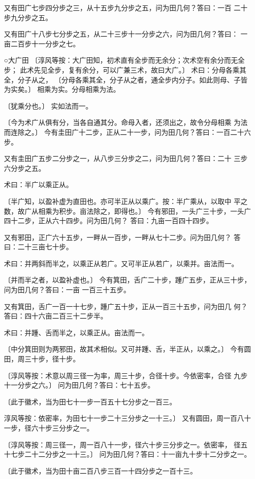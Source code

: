 \documentclass[a4paper,12pt,UTF8,twoside]{ctexbook}
\begin{document}
又有田广七步四分步之三，从十五步九分步之五，问为田几何？答曰：一百 二十步九分步之五。

又有田广十八步七分步之五，从二十三步十一分步之六，问为田几何？答曰： 一亩二百步十一分步之七。

○大广田 〔淳风等按：大广田知，初术直有全步而无余分；次术空有余分而无全步； 此术先见全步，复有余分，可以广兼三术，故曰大广。〕 术曰：分母各乘其全，分子从之， 〔分母各乘其全，分子从之者，通全步内分子。如此则母、子皆为实矣。〕 相乘为实。分母相乘为法。

〔犹乘分也。〕 实如法而一。

〔今为术广从俱有分，当各自通其分。命母入者，还须出之，故令分母相乘 为法而连除之。〕 今有圭田广十二步，正从二十一步，问为田几何？答曰：一百二十六步。

又有圭田广五步二分步之一，从八步三分步之二，问为田几何？答曰：二十 三步六分步之五。

术曰：半广以乘正从。

〔半广知，以盈补虚为直田也。亦可半正从以乘广。按：半广乘从，以取中 平之数，故广从相乘为积步。亩法除之，即得也。〕 今有邪田，一头广三十步，一头广四十二步，正从六十四步。问为田几何？ 答曰：九亩一百四十四步。

又有邪田，正广六十五步，一畔从一百步，一畔从七十二步。问为田几何？ 答曰：二十三亩七十步。

术曰：并两斜而半之，以乘正从若广。又可半正从若广，以乘并。亩法而一。

〔并而半之者，以盈补虚也。〕 今有箕田，舌广二十步，踵广五步，正从三十步，问为田几何？答曰：一亩 一百三十五步。

又有箕田，舌广一百一十七步，踵广五十步，正从一百三十五步，问为田几 何？答曰：四十六亩二百三十二步半。

术曰：并踵、舌而半之，以乘正从。亩法而一。

〔中分箕田则为两邪田，故其术相似。又可并踵、舌，半正从，以乘之。〕 今有圆田，周三十步，径十步。

〔淳风等按：术意以周三径一为率，周三十步，合径十步。今依密率，合径 九步十一分步之六。〕 问为田几何？答曰：七十五步。

〔此于徽术，当为田七十一步一百五十七分步之一百三。

淳风等按：依密率，为田七十一步二十三分步之一十三。〕 又有圆田，周一百八十一步，径六十步三分步之一。

〔淳风等按：周三径一，周一百八十一步，径六十步三分步之一。依密率， 径五十七步二十二分步之一十三。〕 问为田几何？答曰：十一亩九十步十二分步之一。

〔此于徽术，当为田十亩二百八步三百一十四分步之一百十三。
\end{document}

